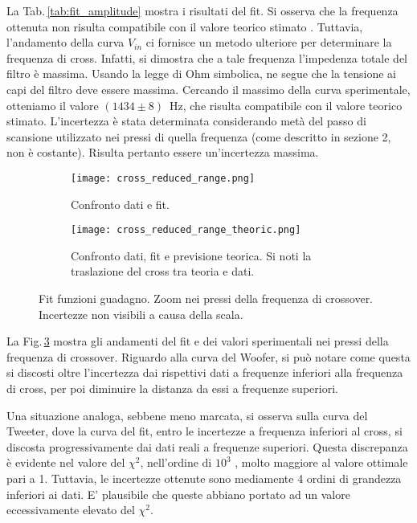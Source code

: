 \documentclass[../Relazione_circuiti]{subfiles}
\begin{document}
  La Tab.\,\ref{tab:fit_amplitude} mostra i risultati del fit.
  Si osserva che la frequenza ottenuta non risulta compatibile con il valore teorico stimato \theoryF.
  Tuttavia, l'andamento della curva $V_{in}$ ci fornisce un metodo ulteriore per determinare la frequenza di cross.
  Infatti, si dimostra che a tale frequenza l'impedenza totale del filtro è massima.
  Usando la legge di Ohm simbolica, ne segue che la tensione ai capi del filtro deve essere massima.
  Cercando il massimo della curva sperimentale, otteniamo il valore $(1434 \pm 8)$~Hz, che risulta compatibile con il
  valore teorico stimato.
  L'incertezza è stata determinata considerando metà del passo di scansione utilizzato nei pressi di quella frequenza
  (come descritto in sezione 2, non è costante).
  Risulta pertanto essere un'incertezza massima.

  \begin{figure}[H]
    \centering

    \begin{subfigure}[t]{=0.49\textwidth}
      \texttt{[image: cross\_reduced\_range.png]}
      \caption{Confronto dati e fit.}
      \label{fig: amp_gain_fit_data_reduced}

    \end{subfigure}
    \hfill
    \begin{subfigure}[t]{=0.49\textwidth}
      \texttt{[image: cross\_reduced\_range\_theoric.png]}
      \caption{Confronto dati, fit e previsione teorica. Si noti la traslazione del cross tra teoria e dati.}
      \label{fig: amp_gain_fit_theoric_reduced}
    \end{subfigure}

    \caption
    {Fit funzioni guadagno. Zoom nei pressi della frequenza di crossover. Incertezze non visibili a causa della scala.}
    \label{fig: amp_gain_fit_reduced}


  \end{figure}

  La Fig.\,\ref{fig: amp_gain_fit_reduced}
  mostra gli andamenti del fit e dei valori sperimentali nei pressi della frequenza di crossover.
  Riguardo alla curva del Woofer, si può notare come questa si discosti oltre l'incertezza dai rispettivi dati a
  frequenze inferiori alla frequenza di cross, per poi diminuire la distanza da essi a frequenze superiori.

  Una situazione analoga, sebbene meno marcata, si osserva sulla curva del Tweeter, dove la curva del fit, entro le
  incertezze a frequenza inferiori al cross, si discosta progressivamente dai dati reali a frequenze superiori.
  Questa discrepanza è evidente nel valore del $\chi^2$, nell'ordine di $10^3$
  , molto maggiore al valore ottimale pari a 1.
  Tuttavia, le incertezze ottenute sono mediamente 4 ordini di grandezza inferiori ai dati. E' plausibile che queste
  abbiano portato ad un valore eccessivamente elevato del $\chi^2$.
\end{document}
